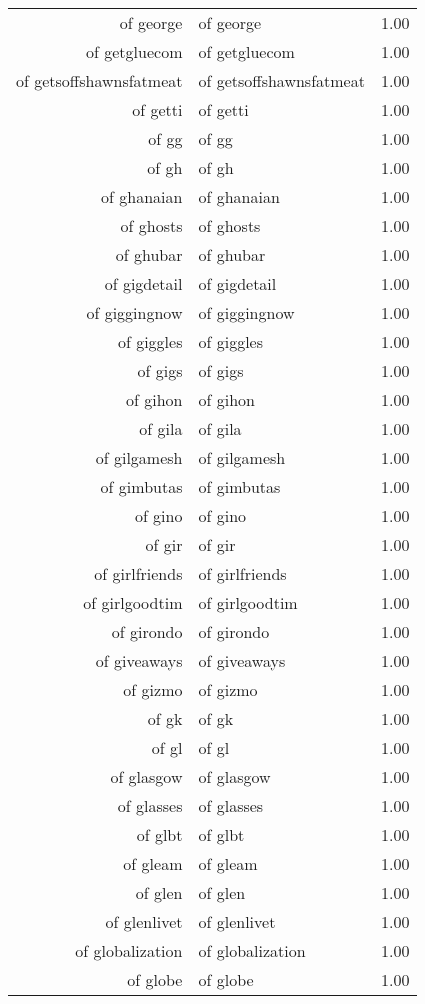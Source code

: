 \begin{table}[ht]
\begin{tabular}{rlr}
  of george & of george & 1.00 \\ 
  of getgluecom & of getgluecom & 1.00 \\ 
  of getsoffshawnsfatmeat & of getsoffshawnsfatmeat & 1.00 \\ 
  of getti & of getti & 1.00 \\ 
  of gg & of gg & 1.00 \\ 
  of gh & of gh & 1.00 \\ 
  of ghanaian & of ghanaian & 1.00 \\ 
  of ghosts & of ghosts & 1.00 \\ 
  of ghubar & of ghubar & 1.00 \\ 
  of gigdetail & of gigdetail & 1.00 \\ 
  of giggingnow & of giggingnow & 1.00 \\ 
  of giggles & of giggles & 1.00 \\ 
  of gigs & of gigs & 1.00 \\ 
  of gihon & of gihon & 1.00 \\ 
  of gila & of gila & 1.00 \\ 
  of gilgamesh & of gilgamesh & 1.00 \\ 
  of gimbutas & of gimbutas & 1.00 \\ 
  of gino & of gino & 1.00 \\ 
  of gir & of gir & 1.00 \\ 
  of girlfriends & of girlfriends & 1.00 \\ 
  of girlgoodtim & of girlgoodtim & 1.00 \\ 
  of girondo & of girondo & 1.00 \\ 
  of giveaways & of giveaways & 1.00 \\ 
  of gizmo & of gizmo & 1.00 \\ 
  of gk & of gk & 1.00 \\ 
  of gl & of gl & 1.00 \\ 
  of glasgow & of glasgow & 1.00 \\ 
  of glasses & of glasses & 1.00 \\ 
  of glbt & of glbt & 1.00 \\ 
  of gleam & of gleam & 1.00 \\ 
  of glen & of glen & 1.00 \\ 
  of glenlivet & of glenlivet & 1.00 \\ 
  of globalization & of globalization & 1.00 \\ 
  of globe & of globe & 1.00 \\ 

\end{tabular}
\end{table}
